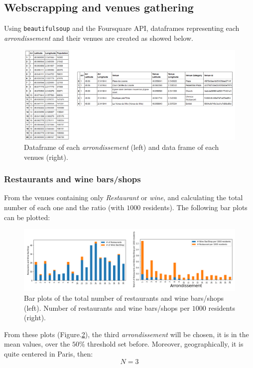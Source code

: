\documentclass[english]{article}
\begin{document}
	\subsection{Webscrapping and venues gathering}
	Using \texttt{beautifulsoup} and the Foursquare API, dataframes representing each \textit{arrondissement} and their venues are created as showed below.	
	\begin{figure}[h]
		\centering
		\includegraphics[width=\linewidth,keepaspectratio]{Figures/DataFrameArrVenues}
		\caption{Dataframe of each \textit{arrondissement} (left) and data frame of each venues (right).}
		\label{DataFrames}
	\end{figure}
	\subsubsection{Restaurants and wine bars/shops}
	From the venues containing only \textit{Restaurant} or \textit{wine}, and calculating the total number of each one and the ratio (with $1000$ residents). The following bar plots can be plotted:
	\begin{figure}[h]
		\centering
		\includegraphics[width=\linewidth,keepaspectratio]{Figures/BarPlots}
		\caption{Bar plots of the total number of restaurants and wine bars/shops (left). Number of restaurants and wine bars/shops per $1000$ residents (right).}
		\label{BarPlots}
	\end{figure}
	From these plots (Figure.\ref{BarPlots}), the third \textit{arrondissement} will be chosen, it is in the mean values, over the $50\%$ threshold set before. Moreover, geographically, it is quite centered in Paris, then:
	\begin{equation}
		N = 3
	\end{equation}
\end{document}
